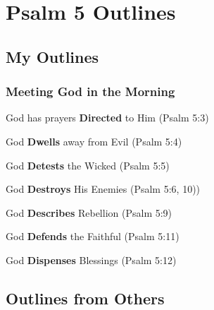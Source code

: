 \section{Psalm 5 Outlines}

\subsection{My Outlines}

\subsubsection{Meeting God in the Morning}
\begin{compactenum}[I.]
    \item God has prayers \textbf{Directed} to Him (Psalm 5:3) 
    \item God \textbf{Dwells} away from Evil (Psalm 5:4)
    \item God \textbf{Detests} the Wicked (Psalm 5:5)
    \item God \textbf{Destroys} His Enemies (Psalm 5:6, 10)) 
    \item God \textbf{Describes} Rebellion (Psalm 5:9) 
    \item God \textbf{Defends} the Faithful (Psalm 5:11)
    \item God \textbf{Dispenses} Blessings (Psalm 5:12)
\end{compactenum}

\subsection{Outlines from Others}

